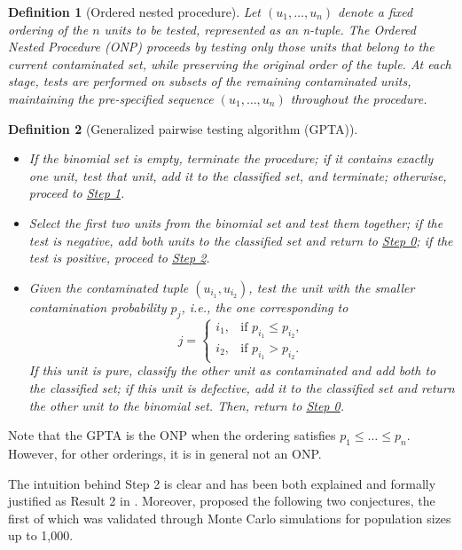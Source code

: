 \documentclass[12pt]{article}
\newtheorem{definition}{Definition}
\begin{document}
\begin{definition}[Ordered nested procedure] Let $\left(u_1,\ldots,u_n\right)$
denote a fixed ordering of the $n$ units to be tested, represented as an n-tuple. The Ordered Nested Procedure (ONP) proceeds by testing only those units that belong to the current contaminated set, while preserving the original order of the tuple. At each stage, tests are performed on subsets of the remaining contaminated units, maintaining the pre-specified sequence
$\left(u_1,\ldots,u_n\right)$ throughout the procedure.
\end{definition}

\begin{definition}[{Generalized pairwise testing {algorithm (GPTA)}}]
\label{def2}
\,
\begin{itemize}
    \item[\underline{Step 0:}] If the binomial set is empty, terminate the procedure; if it contains exactly one unit, test that unit, add it to the classified set, and terminate; otherwise, proceed to \underline{Step 1}.
    \item[\underline{Step 1:}] Select the first two units from the binomial set and test them together; if the test is negative, add both units to the classified set and return to \underline{Step 0}; if the test is positive, proceed to \underline{Step 2}.
    \item[\underline{Step 2:}] Given the contaminated tuple \((u_{i_1}, u_{i_2})\), test the unit with the smaller contamination probability $p_j$, i.e., the one corresponding to
    \[
        j = \begin{cases}
            i_1, & \text{if } p_{i_1} \leq p_{i_2}, \\
            i_2, & \text{if } p_{i_1} > p_{i_2}.
        \end{cases}
    \]
    If this unit is pure, classify the other unit as contaminated and add both to the classified set; if this unit is defective, add it to the classified set and return the other unit to the binomial set. Then, return to \underline{Step 0}.
\end{itemize}
\end{definition}
Note that the {GPTA} is the ONP when the ordering satisfies \( p_1 \leq \dots \leq p_n \). However, for other orderings, it is in general not an ONP.


The intuition behind Step 2 is clear and has been both explained and formally justified as Result 2 in \cite{M2020}. Moreover, \cite{M2020} proposed the following two conjectures, the first of which was validated through Monte Carlo simulations for population sizes up to 1,000.
\end{document}
